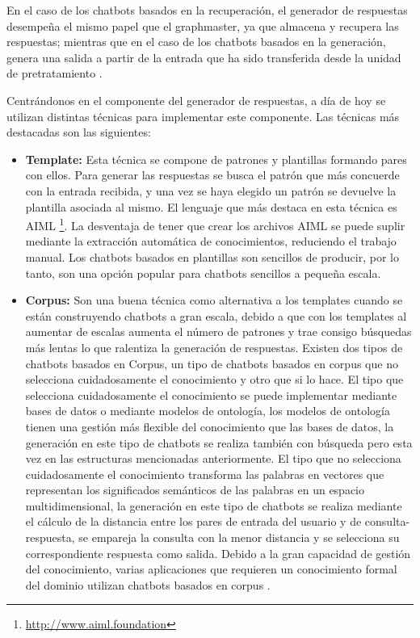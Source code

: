 En el caso de los chatbots basados en la recuperación, el generador de respuestas desempeña el mismo papel que el graphmaster, ya que almacena y recupera las respuestas; mientras que en el caso de los chatbots basados en la generación, genera una salida a partir de la entrada que ha sido transferida desde la unidad de pretratamiento \cite{RefWorks:RefID:36-luo2022critical}.

Centrándonos en el componente del generador de respuestas, a día de hoy se utilizan distintas técnicas para implementar este componente. Las técnicas más destacadas son las siguientes:

\begin{itemize}
\item \textbf{Template:} Esta técnica se compone de patrones y plantillas formando pares con ellos. Para generar las respuestas se busca el patrón que más concuerde con la entrada recibida, y una vez se haya elegido un patrón se devuelve la plantilla asociada al mismo. El lenguaje que más destaca en esta técnica es AIML \footnote{\url{http://www.aiml.foundation}}. La desventaja de tener que crear los archivos AIML se puede suplir mediante la extracción automática de conocimientos, reduciendo el trabajo manual. Los chatbots basados en plantillas son sencillos de producir, por lo tanto, son una opción popular para chatbots sencillos a pequeña escala.
\item \textbf{Corpus:} Son una buena técnica como alternativa a los templates cuando se están construyendo chatbots a gran escala, debido a que con los templates al aumentar de escalas aumenta el número de patrones y trae consigo búsquedas más lentas lo que ralentiza la generación de respuestas. Existen dos tipos de chatbots basados en Corpus, un tipo de chatbots basados en corpus que no selecciona cuidadosamente el conocimiento y otro que si lo hace. El tipo que selecciona cuidadosamente el conocimiento se puede implementar mediante bases de datos o mediante modelos de ontología, los modelos de ontología tienen una gestión más flexible del conocimiento que las bases de datos, la generación en este tipo de chatbots se realiza también con búsqueda pero esta vez en las estructuras mencionadas anteriormente. El tipo que no selecciona cuidadosamente el conocimiento transforma las palabras en vectores que representan los significados semánticos de las palabras en un espacio multidimensional, la generación en este tipo de chatbots se realiza mediante el cálculo de la distancia entre los pares de entrada del usuario y de consulta-respuesta, se empareja la consulta con la menor distancia y se selecciona su correspondiente respuesta como salida. Debido a la gran capacidad de gestión del conocimiento, varias aplicaciones que requieren un conocimiento formal del dominio utilizan chatbots basados en corpus \cite{RefWorks:RefID:36-luo2022critical}.

\end{itemize}

